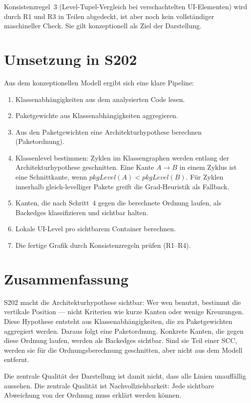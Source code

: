 \documentclass[a4paper,11pt]{article}
\begin{document}
Konsistenzregel~3 (Level-Tupel-Vergleich bei verschachtelten UI-Elementen)
wird durch R1 und R3 in Teilen abgedeckt, ist aber noch kein vollst\"andiger
maschineller Check. Sie gilt konzeptionell als Ziel der Darstellung.

\section{Umsetzung in S202}

Aus dem konzeptionellen Modell ergibt sich eine klare Pipeline:

\begin{enumerate}
  \item Klassenabh\"angigkeiten aus dem analysierten Code lesen.
  \item Paketgewichte aus Klassenabh\"angigkeiten aggregieren.
  \item Aus den Paketgewichten eine Architekturhypothese berechnen
        (Paketordnung).
  \item Klassenlevel bestimmen: Zyklen im Klassengraphen werden entlang
        der Architekturhypothese geschnitten. Eine Kante $A \to B$ in einem
        Zyklus ist eine Schnittkante, wenn $pkgLevel(A) < pkgLevel(B)$.
        F\"ur Zyklen innerhalb gleich-levelliger Pakete greift die
        Grad-Heuristik als Fallback.
  \item Kanten, die nach Schritt~4 gegen die berechnete Ordnung laufen,
        als Backedges klassifizieren und sichtbar halten.
  \item Lokale UI-Level pro sichtbarem Container berechnen.
  \item Die fertige Grafik durch Konsistenzregeln pr\"ufen (R1--R4).
\end{enumerate}

\section{Zusammenfassung}

S202 macht die Architekturhypothese sichtbar: Wer wen benutzt, bestimmt
die vertikale Position --- nicht Kriterien wie kurze Kanten oder wenige
Kreuzungen. Diese Hypothese entsteht aus Klassenabh\"angigkeiten,
die zu Paketgewichten aggregiert werden. Daraus folgt eine Paketordnung.
Konkrete Kanten, die gegen diese Ordnung laufen, werden als Backedges
sichtbar. Sind sie Teil einer SCC, werden sie f\"ur die Ordnungsberechnung
geschnitten, aber nicht aus dem Modell entfernt.

Die zentrale Qualit\"at der Darstellung ist damit nicht, dass alle Linien
unauff\"allig aussehen. Die zentrale Qualit\"at ist Nachvollziehbarkeit: Jede
sichtbare Abweichung von der Ordnung muss erkl\"art werden k\"onnen.
\end{document}
